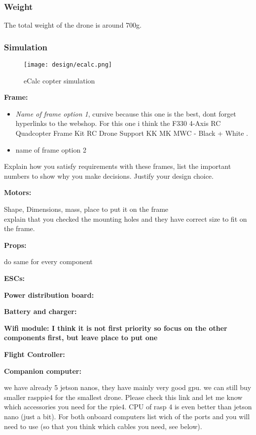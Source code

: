             \subsubsection{Weight}
                The total weight of the drone is around 700g.
                
            \subsubsection{Simulation}
                \begin{figure}[!ht]
                    \centering
                    \texttt{[image: design/ecalc.png]}
                    \caption{eCalc copter simulation}
                    \label{fig:ecalc}
                \end{figure}

\textbf{Frame:}
\begin{itemize}
    \item \textit{Name of frame option 1}, cursive because this one is the best, dont forget hyperlinks to the webshop. For this one i think the F330 4-Axis RC Quadcopter Frame Kit RC Drone Support KK MK MWC - Black + White \cite{bangood_f330}.
    \item name of frame option 2
\end{itemize}
Explain how you satisfy requirements with these frames, list the important numbers to show why you make decisions. Justify your design choice.

\textbf{Motors:}

Shape, Dimensions, mass, place to put it on the frame
\\explain that you checked the mounting holes and they have correct size to fit on the frame.

\textbf{Props:}

do same for every component

\textbf{ESCs:}

\textbf{Power distribution board:}

\textbf{Battery and charger:}

\textbf{Wifi module: I think it is not first priority so focus on the other components first, but leave place to put one}

\textbf{Flight Controller:}

\textbf{Companion computer:}

we have already 5 jetson nanos, they have mainly very good gpu. we can still buy smaller rasppie4 for the smallest drone. Please check this link \cite{rpi_products} and let me know which accessories you need for the rpie4. CPU of rasp 4 is even better than jetson nano (just a bit). For both onboard computers list wich of the ports and you will need to use (so that you think which cables you need, see below).

